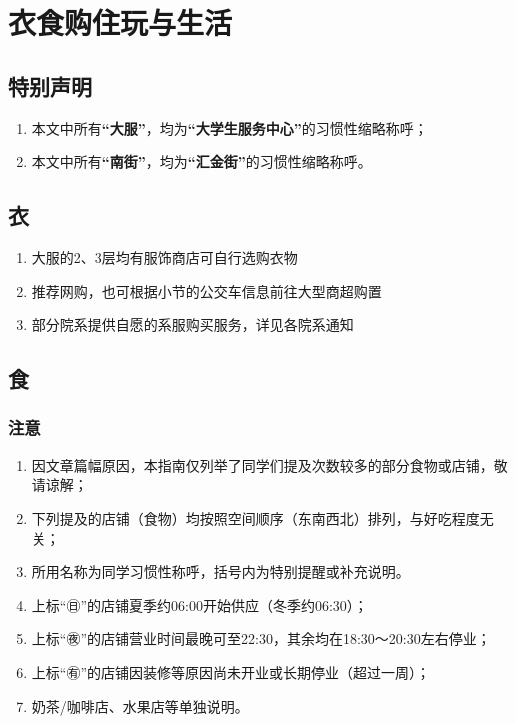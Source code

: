 \section[衣食购住玩与生活]{衣食购住玩与生活}

\subsection*{特别声明}
\begin{enumerate}
    \item 本文中所有\textbf{“大服”}，均为\textbf{“大学生服务中心”}的习惯性缩略称呼；
    \item 本文中所有\textbf{“南街”}，均为\textbf{“汇金街”}的习惯性缩略称呼。
\end{enumerate}
\subsection[衣]{衣}
\begin{enumerate}
    \item 大服的2、3层均有服饰商店可自行选购衣物
    \item 推荐网购，也可根据小节的公交车信息前往大型商超购置
    \item 部分院系提供自愿的系服购买服务，详见各院系通知
\end{enumerate}

\subsection[食]{食}
\subsubsection*{注意}
\begin{enumerate}
    \item 因文章篇幅原因，本指南仅列举了同学们提及次数较多的部分食物或店铺，敬请谅解；
    \item 下列提及的店铺（食物）均按照空间顺序（东南西北）排列，与好吃程度无关；
    \item 所用名称为同学习惯性称呼，括号内为特别提醒或补充说明。
    \item 上标“㊐”的店铺夏季约06:00开始供应（冬季约06:30）；
    \item 上标“㊰”的店铺营业时间最晚可至22:30，其余均在18:30～20:30左右停业；
    \item 上标“㊒”的店铺因装修等原因尚未开业或长期停业（超过一周）；
    \item 奶茶/咖啡店、水果店等单独说明。
\end{enumerate}

